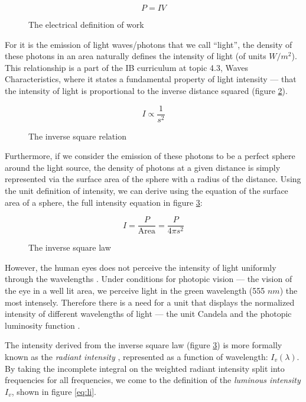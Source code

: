 \documentclass[a4paper,12pt]{article}
\begin{document}
\begin{figure}[h!]
    \[
    P = IV
    \]
    \caption{The electrical definition of work}
    \label{eq:work}
\end{figure}

For it is the emission of light waves/photons that we call ``light'', the density of these photons in an area naturally defines the intensity of light (of units $\si{W\per m^2}$). This relationship is a part of the IB curriculum at topic 4.3, Waves Characteristics, where it states a fundamental property of light intensity --- that the intensity of light is proportional to the inverse distance squared (figure \ref{eq:prop}).

\begin{figure}[h!]
    \[
    I \propto \frac{1}{s^2}
    \]
    \caption{The inverse square relation}
    \label{eq:prop}
\end{figure}

Furthermore, if we consider the emission of these photons to be a perfect sphere around the light source, the density of photons at a given distance is simply represented via the surface area of the sphere with a radius of the distance.
Using the unit definition of intensity, we can derive using the equation of the surface area of a sphere, the full intensity equation in figure \ref{eq:isl}:

\begin{figure}[h!]
    \[
    I = \frac{P}{\text{Area}} = \frac{P}{4\pi s^2}
    \]
    \caption{The inverse square law}
    \label{eq:isl}
\end{figure}

However, the human eyes does not perceive the intensity of light uniformly through the wavelengths \parencite{candela}. Under conditions for photopic vision --- the vision of the eye in a well lit area, we perceive light in the green wavelength (555 $\si{nm}$) the most intensely. Therefore there is a need for a unit that displays the normalized intensity of different wavelengths of light --- the unit Candela and the photopic luminosity function \parencite{si_candela}.

The intensity derived from the inverse square law (figure \ref{eq:isl}) is more formally known as the \textit{radiant intensity} \parencite{candela}, represented as a function of wavelength: $I_v(\lambda)$. By taking the incomplete integral on the weighted radiant intensity split into frequencies for all frequencies, we come to the definition of the \textit{luminous intensity} $I_v$, shown in figure \ref{eq:li}.
\end{document}
